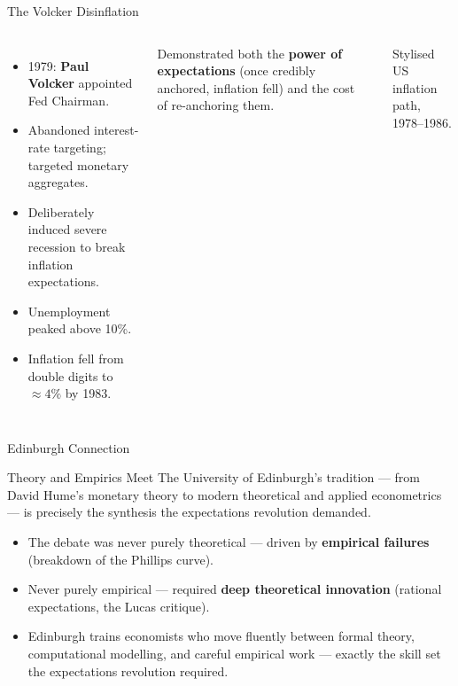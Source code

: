 \documentclass[aspectratio=169, 10pt]{beamer}
\begin{document}
\begin{frame}{The Volcker Disinflation}
\begin{columns}[T]
\begin{itemize}
  \item 1979: \textbf{Paul Volcker} appointed Fed Chairman.
  \item Abandoned interest-rate targeting; targeted monetary aggregates.
  \item Deliberately induced severe recession to break inflation expectations.
  \item Unemployment peaked above 10\%.
  \item Inflation fell from double digits to $\approx4\%$ by 1983.
\end{itemize}
\vspace{0.3em}
Demonstrated both the \textbf{power of expectations} (once credibly
anchored, inflation fell) and the \alert{cost of re-anchoring} them.
\begin{center}
\end{center}
\vspace{0.2em}
{\scriptsize Stylised US inflation path, 1978--1986.}
\end{columns}
\end{frame}

\begin{frame}{Edinburgh Connection}
\begin{block}{Theory and Empirics Meet}
The University of Edinburgh's tradition --- from David Hume's monetary theory
to modern theoretical and applied econometrics --- is precisely the
synthesis the expectations revolution demanded.
\end{block}
\vspace{0.5em}
\begin{itemize}
  \item The debate was never purely theoretical --- driven by
        \textbf{empirical failures} (breakdown of the Phillips curve).
  \item Never purely empirical --- required \textbf{deep theoretical innovation}
        (rational expectations, the Lucas critique).
  \item Edinburgh trains economists who move fluently between formal theory,
        computational modelling, and careful empirical work --- exactly
        the skill set the expectations revolution required.
\end{itemize}
\end{frame}
\end{document}
